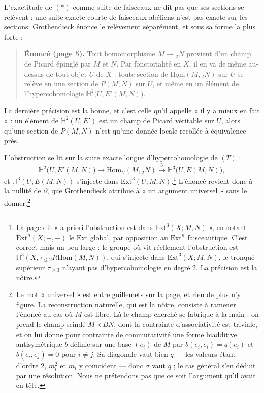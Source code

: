 \documentclass[11pt,a4paper]{article}
\begin{document}
L'exactitude de $(*)$ comme suite de faisceaux ne dit pas que ses sections se
relèvent : une suite exacte courte de faisceaux abéliens n'est pas exacte sur
les sections. Grothendieck énonce le relèvement séparément, et sous sa forme
la plus forte :

\begin{quote}
\textbf{Énoncé (page 5).} Tout homomorphisme $M \to {}_2N$ provient d'un champ
de Picard épinglé par $M$ et $N$. Par fonctorialité en $X$, il en va de même
au-dessus de tout objet $U$ de $X$ : toute section de
$\underline{\mathrm{Hom}}(M, {}_2N)$ sur $U$ se relève en une section de
$P(M,N)$ sur $U$, et même en un élément de l'hypercohomologie
$\mathbb{H}^2\bigl(U, E'(M,N)\bigr)$.
\end{quote}

La dernière précision est la bonne, et c'est celle qu'il appelle « il y a
mieux en fait » : un élément de $\mathbb{H}^2(U, E')$ est un champ de Picard
véritable sur $U$, alors qu'une section de $P(M,N)$ n'est qu'une donnée locale
recollée à équivalence près.

L'obstruction se lit sur la suite exacte longue d'hypercohomologie de $(T)$ :
\[ \mathbb{H}^2\bigl(U, E'(M,N)\bigr) \longrightarrow
   \mathrm{Hom}_U(M, {}_2N) \xrightarrow{\ \partial\ }
   \mathbb{H}^3\bigl(U, E(M,N)\bigr), \]
et $\mathbb{H}^3(U, E(M,N))$ s'injecte dans $\mathrm{Ext}^3(U; M,
N)$.\footnote{La page dit « a priori l'obstruction est dans
$\mathrm{Ext}^3(X;M,N)$ », en notant $\mathrm{Ext}^n(X;-,-)$ le $\mathrm{Ext}$
global, par opposition au $\underline{\mathrm{Ext}}^n$ faisceautique. C'est
correct mais un peu large : le groupe où vit réellement l'obstruction est
$\mathbb{H}^3(X, \tau_{\leq 2} R\underline{\mathrm{Hom}}(M,N))$, qui s'injecte
dans $\mathrm{Ext}^3(X;M,N)$, le tronqué supérieur $\tau_{\geq 3}$ n'ayant
pas d'hypercohomologie en degré $2$. La précision est la nôtre.} L'énoncé revient donc à
la nullité de $\partial$, que Grothendieck attribue à « un argument
universel » sans le donner.\footnote{Le mot « universel » est entre guillemets
sur la page, et rien de plus n'y figure. La reconstruction naturelle, qui est
la nôtre, consiste à ramener l'énoncé au cas où $M$ est libre. Là le champ
cherché se fabrique à la main : on prend le champ scindé $M \times BN$, dont la
contrainte d'associativité est triviale, et on lui donne pour contrainte de
commutativité une forme biadditive antisymétrique $b$ définie sur une base
$(e_i)$ de $M$ par $b(e_i,e_i) = q(e_i)$ et $b(e_i,e_j) = 0$ pour $i \neq j$.
Sa diagonale vaut bien $q$ --- les valeurs étant d'ordre $2$, $m_i^2$ et $m_i$
y coïncident --- donc $\sigma$ vaut $q$ ; le cas général s'en déduit par une
résolution. Nous ne prétendons
pas que ce soit l'argument qu'il avait en tête.}
\end{document}
